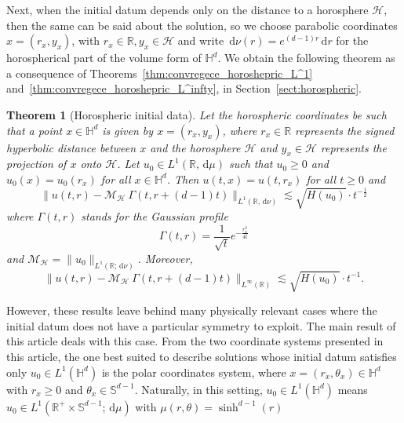 \documentclass[12pt,longbibliography]{article}
\newcommand{\abs}[1]{\left\vert#1\right\vert}
\def\R{\mathbb{R}}
\def\S{\mathbb{S}}
\def\d{\,\mathrm{d}}
\def\R{\mathbb{R}}
\def\d{\,\mathrm{d}}
\def\H{\mathbb{H}}
\newtheorem{thm}{Theorem}[section]
\theoremstyle{definition}
\theoremstyle{remark}
\theoremstyle{example}
\newcommand{\ag}[1]{{\color{magenta} #1}}
\begin{document}
%

Next, when the initial datum depends only on the distance to a horosphere $\mathcal{H}$, then the same can be said about the solution, so we choose parabolic coordinates $x=(r_x,y_x)$, with $r_x\in\R, y_x\in\mathcal{H}$ and write $\d\nu(r)=e^{(d-1)r}\d r$ for the horospherical part of the volume form of $\mathbb{H}^d$. We obtain the following theorem as a consequence of Theorems~\ref{thm:convregece_horoshepric_L^1} and~\ref{thm:convregece_horoshepric_L^infty}, in Section~\ref{sect:horospheric}.

\begin{thm}[Horospheric initial data]
	Let the horospheric coordinates be such that a point $x\in\H^d$ is given by $x=(r_x, y_x)$, where $r_x\in\R$ represents the signed hyperbolic distance between $x$ and the horosphere $\mathcal{H}$ and $y_x\in\mathcal{H}$ represents the projection of $x$ onto $\mathcal{H}$. Let $u_0\in L^1(\R, \d\mu)$ such that $u_0\geq 0$ and $u_0(x)=u_0(r_x)$ for all $x\in\H^d$. Then $u(t,x)=u(t, r_x)$ for all $t\geq 0$ and
	\[
	\|u(t,r)- \mathcal{M}_{\mathcal{H}}\ \Gamma(t, r+(d-1)t) \|_{L^1(\R, \d\nu)} \lesssim \sqrt{H(u_0)} \cdot t^{-\frac{1}{2}}
	\]
	where $\Gamma(t,r)$ stands for the Gaussian profile
	\[
	\Gamma(t,r)=\frac{1}{\sqrt{t}}e^{-\frac{r_x^2}{4t}}
	\]
	and $\mathcal{M}_{\mathcal{H}} = \|u_0\|_{L^1(\mathbb{R}; \d\nu)}$. Moreover,
	\[
	\|u(t,r)- \mathcal{M}_{\mathcal{H}}\ \Gamma(t, r+(d-1)t) \|_{L^\infty(\R)} \lesssim \sqrt{H(u_0)} \cdot t^{-1}.
	\]
\end{thm}

However, these results leave behind many physically relevant cases where the initial datum does not have a particular symmetry to exploit. The main result of this article deals with this case. From the two coordinate systems presented in this article, the one best suited to describe solutions whose initial datum satisfies only $u_0\in L^1(\H^d)$ is the polar coordinates system, where $x=(r_x, \theta_x)\in\H^d$ with $r_x\geq 0$ and $\theta_x\in \S^{d-1}$. Naturally, in this setting, $u_0\in L^1(\H^d)$ means $u_0\in L^1(\R^+\times\S^{d-1}; \d\mu)$ with $\mu(r, \theta) = \sinh^{d-1}(r)$ 
\end{document}
